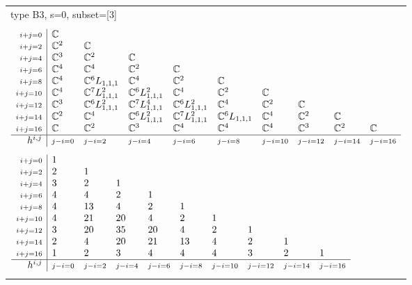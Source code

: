 \documentclass[crop,border=2mm]{standalone}
\begin{document}
\begin{tabular}{l}
{\huge type B3, s=0, subset=[3]}\\ \\


$\displaystyle
\begin{array}{r|l l l l l l l l l}
	{\scriptstyle i+j=0}&\mathbb{C}&&&&&&&&\\
	{\scriptstyle i+j=2}&\mathbb{C}^{2}&\mathbb{C}&&&&&&&\\
	{\scriptstyle i+j=4}&\mathbb{C}^{3}&\mathbb{C}^{2}&\mathbb{C}&&&&&&\\
	{\scriptstyle i+j=6}&\mathbb{C}^{4}&\mathbb{C}^{4}&\mathbb{C}^{2}&\mathbb{C}&&&&&\\
	{\scriptstyle i+j=8}&\mathbb{C}^{4}&\mathbb{C}^{6}L_{1,1,1}&\mathbb{C}^{4}&\mathbb{C}^{2}&\mathbb{C}&&&&\\
	{\scriptstyle i+j=10}&\mathbb{C}^{4}&\mathbb{C}^{7}L_{1,1,1}^{2}&\mathbb{C}^{6}L_{1,1,1}^{2}&\mathbb{C}^{4}&\mathbb{C}^{2}&\mathbb{C}&&&\\
	{\scriptstyle i+j=12}&\mathbb{C}^{3}&\mathbb{C}^{6}L_{1,1,1}^{2}&\mathbb{C}^{7}L_{1,1,1}^{4}&\mathbb{C}^{6}L_{1,1,1}^{2}&\mathbb{C}^{4}&\mathbb{C}^{2}&\mathbb{C}&&\\
	{\scriptstyle i+j=14}&\mathbb{C}^{2}&\mathbb{C}^{4}&\mathbb{C}^{6}L_{1,1,1}^{2}&\mathbb{C}^{7}L_{1,1,1}^{2}&\mathbb{C}^{6}L_{1,1,1}&\mathbb{C}^{4}&\mathbb{C}^{2}&\mathbb{C}&\\
	{\scriptstyle i+j=16}&\mathbb{C}&\mathbb{C}^{2}&\mathbb{C}^{3}&\mathbb{C}^{4}&\mathbb{C}^{4}&\mathbb{C}^{4}&\mathbb{C}^{3}&\mathbb{C}^{2}&\mathbb{C}\\
	\hline h^{i,j}&{\scriptstyle j-i=0}&{\scriptstyle j-i=2}&{\scriptstyle j-i=4}&{\scriptstyle j-i=6}&{\scriptstyle j-i=8}&{\scriptstyle j-i=10}&{\scriptstyle j-i=12}&{\scriptstyle j-i=14}&{\scriptstyle j-i=16}
\end{array}
$ \\ \\


$\displaystyle
\begin{array}{r|l l l l l l l l l}
	{\scriptstyle i+j=0}&1&&&&&&&&\\
	{\scriptstyle i+j=2}&2&1&&&&&&&\\
	{\scriptstyle i+j=4}&3&2&1&&&&&&\\
	{\scriptstyle i+j=6}&4&4&2&1&&&&&\\
	{\scriptstyle i+j=8}&4&13&4&2&1&&&&\\
	{\scriptstyle i+j=10}&4&21&20&4&2&1&&&\\
	{\scriptstyle i+j=12}&3&20&35&20&4&2&1&&\\
	{\scriptstyle i+j=14}&2&4&20&21&13&4&2&1&\\
	{\scriptstyle i+j=16}&1&2&3&4&4&4&3&2&1\\
	\hline h^{i,j}&{\scriptstyle j-i=0}&{\scriptstyle j-i=2}&{\scriptstyle j-i=4}&{\scriptstyle j-i=6}&{\scriptstyle j-i=8}&{\scriptstyle j-i=10}&{\scriptstyle j-i=12}&{\scriptstyle j-i=14}&{\scriptstyle j-i=16}
\end{array}
$ \\ \\



\end{tabular}
\end{document}
